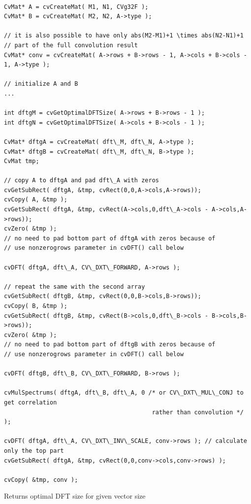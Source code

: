 \begin{lstlisting}

CvMat* A = cvCreateMat( M1, N1, CVg32F );
CvMat* B = cvCreateMat( M2, N2, A->type );

// it is also possible to have only abs(M2-M1)+1 \times abs(N2-N1)+1
// part of the full convolution result
CvMat* conv = cvCreateMat( A->rows + B->rows - 1, A->cols + B->cols - 1, A->type );

// initialize A and B
...

int dftgM = cvGetOptimalDFTSize( A->rows + B->rows - 1 );
int dftgN = cvGetOptimalDFTSize( A->cols + B->cols - 1 );

CvMat* dftgA = cvCreateMat( dft\_M, dft\_N, A->type );
CvMat* dftgB = cvCreateMat( dft\_M, dft\_N, B->type );
CvMat tmp;

// copy A to dftgA and pad dft\_A with zeros
cvGetSubRect( dftgA, &tmp, cvRect(0,0,A->cols,A->rows));
cvCopy( A, &tmp );
cvGetSubRect( dftgA, &tmp, cvRect(A->cols,0,dft\_A->cols - A->cols,A->rows));
cvZero( &tmp );
// no need to pad bottom part of dftgA with zeros because of
// use nonzerogrows parameter in cvDFT() call below

cvDFT( dftgA, dft\_A, CV\_DXT\_FORWARD, A->rows );

// repeat the same with the second array
cvGetSubRect( dftgB, &tmp, cvRect(0,0,B->cols,B->rows));
cvCopy( B, &tmp );
cvGetSubRect( dftgB, &tmp, cvRect(B->cols,0,dft\_B->cols - B->cols,B->rows));
cvZero( &tmp );
// no need to pad bottom part of dftgB with zeros because of
// use nonzerogrows parameter in cvDFT() call below

cvDFT( dftgB, dft\_B, CV\_DXT\_FORWARD, B->rows );

cvMulSpectrums( dftgA, dft\_B, dft\_A, 0 /* or CV\_DXT\_MUL\_CONJ to get correlation
                                          rather than convolution */ );

cvDFT( dftgA, dft\_A, CV\_DXT\_INV\_SCALE, conv->rows ); // calculate only the top part
cvGetSubRect( dftgA, &tmp, cvRect(0,0,conv->cols,conv->rows) );

cvCopy( &tmp, conv );

\end{lstlisting}

\label{GetOptimalDFTSize}

Returns optimal DFT size for given vector size


